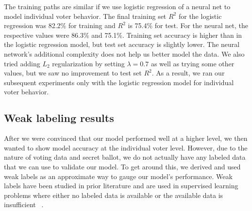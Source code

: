 \documentclass[10pt, letterpaper]{article}
\begin{document}
\begin{multicols}{2}
The training paths are similar if we use logistic regression of a neural net to model individual voter behavior. The final training set $R^2$ for the logistic regression was 82.2\% for training and $R^2$ is 75.4\% for test. For the neural net, the respective values were 86.3\% and 75.1\%. Training set accuracy is higher than in the logistic regression model, but test set accuracy is slightly lower. The neural network's additional complexity does not help us better model the data. We also tried adding $L_2$ regularization by setting $\lambda = 0.7$ as well as trying some other values, but we saw no improvement to test set $R^2$. As a result, we ran our subsequent experiments only with the logistic regression model for individual voter behavior.

\subsection{Weak labeling results}

After we were convinced that our model performed well at a higher level, we then wanted to show model accuracy at the individual voter level. However, due to the nature of voting data and secret ballot, we do not actually have any labeled data that we can use to validate our model. To get around this, we derived and used weak labels as an approximate way to gauge our model's performance. Weak labels have been studied in prior literature and are used in supervised learning problems where either no labeled data is available or the available data is insufficient ~\cite{rbvr2017}.


\end{multicols}
\end{document}
